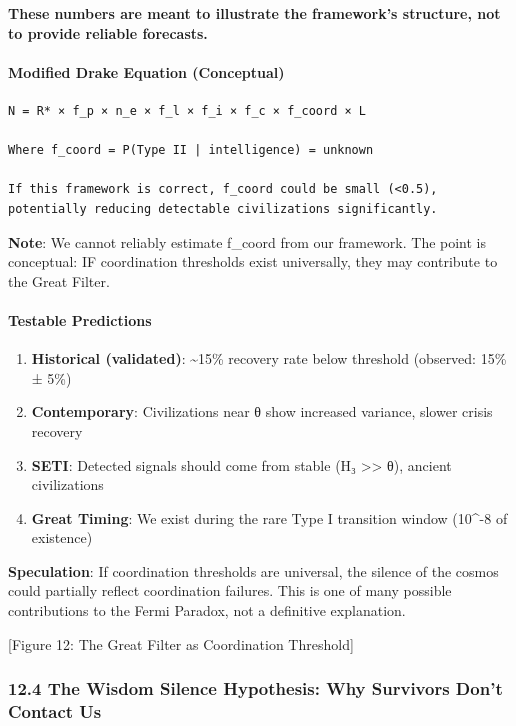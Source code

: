 \documentclass[11pt,letterpaper]{article}
\providecommand{\tightlist}{%
  \setlength{\itemsep}{0pt}\setlength{\parskip}{0pt}}
\begin{document}
\textbf{These numbers are meant to illustrate the framework's structure,
not to provide reliable forecasts.}

\paragraph{Modified Drake Equation
(Conceptual)}\label{modified-drake-equation-conceptual}

\begin{verbatim}
N = R* × f_p × n_e × f_l × f_i × f_c × f_coord × L

Where f_coord = P(Type II | intelligence) = unknown

If this framework is correct, f_coord could be small (<0.5),
potentially reducing detectable civilizations significantly.
\end{verbatim}

\textbf{Note}: We cannot reliably estimate f\_coord from our framework.
The point is conceptual: IF coordination thresholds exist universally,
they may contribute to the Great Filter.

\paragraph{Testable Predictions}\label{testable-predictions}

\begin{enumerate}
\def\labelenumi{\arabic{enumi}.}
\tightlist
\item
  \textbf{Historical (validated)}: \textasciitilde15\% recovery rate
  below threshold (observed: 15\% ± 5\%)
\item
  \textbf{Contemporary}: Civilizations near θ show increased variance,
  slower crisis recovery
\item
  \textbf{SETI}: Detected signals should come from stable (H₃
  \textgreater\textgreater{} θ), ancient civilizations
\item
  \textbf{Great Timing}: We exist during the rare Type I transition
  window (10\^{}-8 of existence)
\end{enumerate}

\textbf{Speculation}: If coordination thresholds are universal, the
silence of the cosmos could partially reflect coordination failures.
This is one of many possible contributions to the Fermi Paradox, not a
definitive explanation.

{[}Figure 12: The Great Filter as Coordination Threshold{]}

\subsubsection{12.4 The Wisdom Silence Hypothesis: Why Survivors Don't
Contact
Us}\label{the-wisdom-silence-hypothesis-why-survivors-dont-contact-us}
\end{document}
